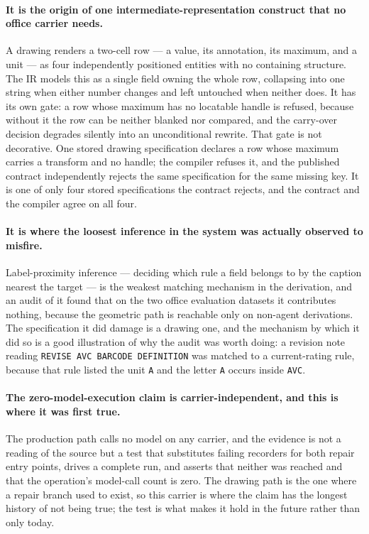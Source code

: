 \paragraph{It is the origin of one intermediate-representation construct that no office
carrier needs.}
A drawing renders a two-cell row --- a value, its annotation, its maximum, and a unit --- as
four independently positioned entities with no containing structure. The IR models this as a
single field owning the whole row, collapsing into one string when either number changes and
left untouched when neither does. It has its own gate: a row whose maximum has no locatable
handle is refused, because without it the row can be neither blanked nor compared, and the
carry-over decision degrades silently into an unconditional rewrite. That gate is not
decorative. One stored drawing specification declares a row whose maximum carries a transform
and no handle; the compiler refuses it, and the published contract independently rejects the
same specification for the same missing key. It is one of only four stored specifications the
contract rejects, and the contract and the compiler agree on all four.

\paragraph{It is where the loosest inference in the system was actually observed to misfire.}
Label-proximity inference --- deciding which rule a field belongs to by the caption nearest the
target --- is the weakest matching mechanism in the derivation, and an audit of it found that
on the two office evaluation datasets it contributes nothing, because the geometric path is
reachable only on non-agent derivations. The specification it did damage is a drawing one, and
the mechanism by which it did so is a good illustration of why the audit was worth doing: a
revision note reading \texttt{REVISE AVC BARCODE DEFINITION} was matched to a current-rating
rule, because that rule listed the unit \texttt{A} and the letter \texttt{A} occurs inside
\texttt{AVC}.

\paragraph{The zero-model-execution claim is carrier-independent, and this is where it was
first true.}
The production path calls no model on any carrier, and the evidence is not a reading of the
source but a test that substitutes failing recorders for both repair entry points, drives a
complete run, and asserts that neither was reached and that the operation's model-call count is
zero. The drawing path is the one where a repair branch used to exist, so this carrier is where
the claim has the longest history of not being true; the test is what makes it hold in the
future rather than only today.

